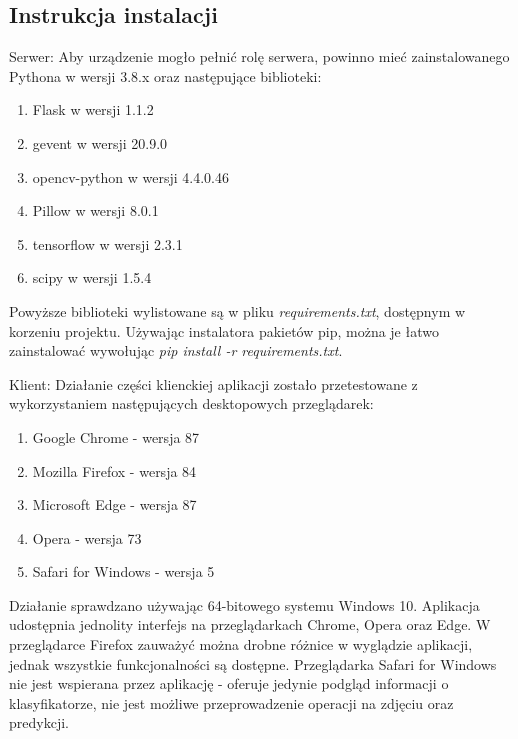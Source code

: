 \documentclass[polish,12pt]{aghthesis}
\begin{document}
\subsection{Instrukcja instalacji}
\par Serwer:
\newline Aby urządzenie mogło pełnić rolę serwera, powinno mieć zainstalowanego Pythona w wersji 3.8.x oraz następujące biblioteki:
\begin{enumerate}
    \item Flask w wersji 1.1.2
    \item gevent w wersji 20.9.0
    \item opencv-python w wersji 4.4.0.46
    \item Pillow w wersji 8.0.1
    \item tensorflow w wersji 2.3.1
    \item scipy w wersji 1.5.4
\end{enumerate}
\par Powyższe biblioteki wylistowane są w pliku \textit{requirements.txt}, dostępnym w korzeniu projektu. Używając instalatora pakietów pip, można je łatwo zainstalować wywołując \textit{pip install -r requirements.txt}.

\vspace{5mm}
\par\noindent Klient:
\newline Działanie części klienckiej aplikacji zostało przetestowane z wykorzystaniem następujących desktopowych przeglądarek:
\begin{enumerate}
    \item Google Chrome - wersja 87
    \item Mozilla Firefox - wersja 84
    \item Microsoft Edge - wersja 87
    \item Opera - wersja 73
    \item Safari for Windows - wersja 5 
\end{enumerate}
Działanie sprawdzano używając 64-bitowego systemu Windows 10.
\newline Aplikacja udostępnia jednolity interfejs na przeglądarkach Chrome, Opera oraz Edge. W przeglądarce Firefox zauważyć można drobne różnice w wyglądzie aplikacji, jednak wszystkie funkcjonalności są dostępne. Przeglądarka Safari for Windows nie jest wspierana przez aplikację - oferuje jedynie podgląd informacji o klasyfikatorze, nie jest możliwe przeprowadzenie operacji na zdjęciu oraz predykcji.
\end{document}
